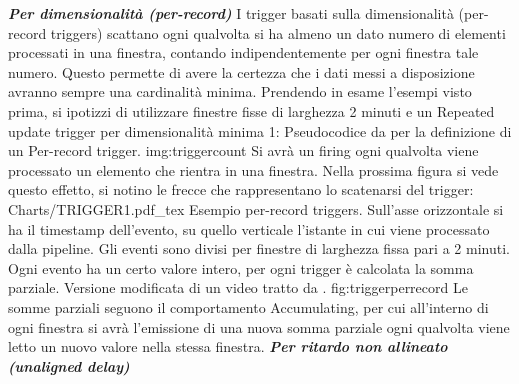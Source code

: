 \textbf{\textit{
		Per dimensionalità (per-record)
	}}
I trigger basati sulla dimensionalità (per-record triggers) scattano ogni qualvolta si ha almeno un dato numero di elementi processati in una finestra, contando indipendentemente per ogni finestra tale numero. Questo permette di avere la certezza che i dati messi a disposizione avranno sempre una cardinalità minima. Prendendo in esame l’esempi visto prima, si ipotizzi di utilizzare finestre fisse di larghezza 2 minuti e un Repeated update trigger per dimensionalità minima 1:
{Pseudocodice da \cite{akidauchernyaklax} per la definizione di un Per-record trigger.}
{img:triggercount}
Si avrà un firing ogni qualvolta viene processato un elemento che rientra in una finestra. Nella prossima figura si vede questo effetto, si notino le frecce che rappresentano lo scatenarsi del trigger:
\svg
{Charts/TRIGGER1.pdf_tex}
{Esempio per-record triggers. Sull'asse orizzontale si ha il timestamp dell'evento, su quello verticale l'istante in cui viene processato dalla pipeline. Gli eventi sono divisi per finestre di larghezza fissa pari a 2 minuti. Ogni evento ha un certo valore intero, per ogni trigger è calcolata la somma parziale. Versione modificata di un video tratto da  \cite{akidau_chernyak_lax_2018}.}
{fig:triggerperrecord}
Le somme parziali seguono il comportamento Accumulating, per cui all'interno di ogni finestra si avrà l'emissione di una nuova somma parziale ogni qualvolta viene letto un nuovo valore nella stessa finestra.
\textbf{\textit{
		Per ritardo non allineato (unaligned delay)
	}}

